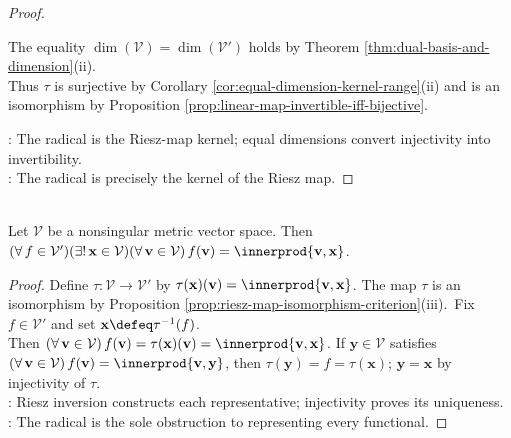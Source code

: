 \begin{proposition}
\begin{proof}
\begin{enumerate}[label=(\roman*)]
The equality $\dim(\mathcal{V})=\dim(\mathcal{V}')$ holds by Theorem \ref{thm:dual-basis-and-dimension}(ii).\\
Thus $\tau$ is surjective by Corollary \ref{cor:equal-dimension-kernel-range}(ii) and is an isomorphism by Proposition \ref{prop:linear-map-invertible-iff-bijective}.
\end{enumerate}
: The radical is the Riesz-map kernel; equal dimensions convert injectivity into invertibility.\\
: The radical is precisely the kernel of the Riesz map.
\end{proof}
\end{proposition}

\begin{theorem} \label{thm:riesz-map-for-nonsingular-metric-spaces} \\
Let $\mathcal{V}$ be a nonsingular metric vector space. Then $(\forall\,f\in\mathcal{V}')(\exists!\,\mathbf{x}\in\mathcal{V})(\forall\,\mathbf{v}\in\mathcal{V})\,f(\mathbf{v})=\innerprod{\mathbf{v},\mathbf{x}}$.
\begin{proof} Define $\tau:\mathcal{V}\to\mathcal{V}'$ by $\tau(\mathbf{x})(\mathbf{v})=\innerprod{\mathbf{v},\mathbf{x}}$. The map $\tau$ is an isomorphism by Proposition \ref{prop:riesz-map-isomorphism-criterion}(iii).\ Fix $f\in\mathcal{V}'$ and set $\mathbf{x}\defeq\tau^{-1}(f)$.\\
Then $(\forall\,\mathbf{v}\in\mathcal{V})\,f(\mathbf{v})=\tau(\mathbf{x})(\mathbf{v})=\innerprod{\mathbf{v},\mathbf{x}}$. If $\mathbf{y}\in\mathcal{V}$ satisfies $(\forall\,\mathbf{v}\in\mathcal{V})\,f(\mathbf{v})=\innerprod{\mathbf{v},\mathbf{y}}$, then $\tau(\mathbf{y})=f=\tau(\mathbf{x})$; $\mathbf{y}=\mathbf{x}$ by injectivity of $\tau$.\\
: Riesz inversion constructs each representative; injectivity proves its uniqueness.\\
: The radical is the sole obstruction to representing every functional.
\end{proof}
\end{theorem}

